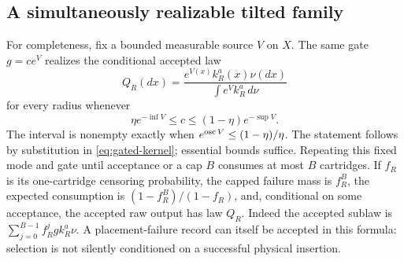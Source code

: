 \subsection{A simultaneously realizable tilted family}
For completeness, fix a bounded measurable source $V$ on $X$. The same
gate $g=c e^V$ realizes the conditional accepted law
\[
 Q_R(dx)=\frac{e^{V(x)}k_R^a(x)\nu(dx)}{\int e^Vk_R^a\,d\nu}
\]
for every radius whenever
\[
 \eta e^{-\inf V}\le c\le(1-\eta)e^{-\sup V}.
\]
The interval is nonempty exactly when
$e^{\operatorname{osc} V}\le(1-\eta)/\eta$. The statement follows by substitution in
\eqref{eq:gated-kernel}; essential bounds suffice. Repeating this fixed mode
and gate until acceptance or a cap $B$ consumes at most $B$ cartridges.
If $f_R$ is its one-cartridge censoring probability, the capped failure mass
is $f_R^B$, the expected consumption is
$(1-f_R^B)/(1-f_R)$, and, conditional on some acceptance, the accepted raw
output has law $Q_R$. Indeed the accepted sublaw is
$\sum_{j=0}^{B-1}f_R^j gk_R^a\nu$. A placement-failure record can itself be
accepted in this formula: selection is not silently conditioned on a
successful physical insertion.
